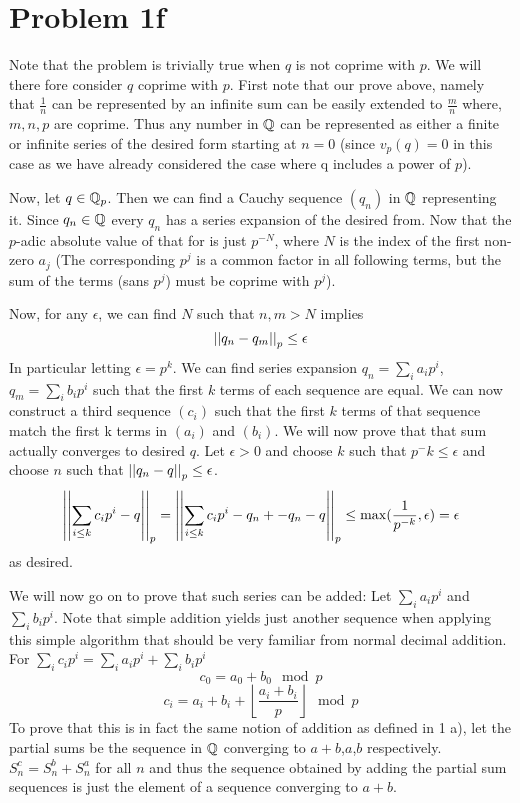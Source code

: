 \section*{Problem 1f}
Note that the problem is trivially true when $q$ is not coprime with $p$. We will there fore consider $q$ coprime with $p$. First note that our prove above, namely that $\frac{1}{n}$ can be represented by an infinite sum can be easily extended to $\frac{m}{n}$ where, $m,n,p$ are coprime. Thus any number in $\mathbb{Q}$ can be represented as either a finite or infinite series of the desired form starting at $n=0$ (since $v_p(q) = 0$ in this case as we have already considered the case where q includes a power of $p$).  \par
Now, let $q\in \mathbb{Q}_p$. Then we can find a Cauchy sequence $(q_n)$ in $\mathbb{Q}$ representing it. Since $q_n \in \mathbb{Q}$ every $q_n$ has a series expansion of the desired from. Now that the $p$-adic absolute value of that for is just $p^{-N}$, where $N$ is the index of the first non-zero $a_j$ (The corresponding $p^j$ is a common factor in all following terms, but the sum of the terms (sans $p^j$) must be coprime with $p^j$). \par
Now, for any $\epsilon$, we can find $N$ such that $n,m>N$ implies 
\[ \left|\left| q_n-q_m \right|\right|_p \leq \epsilon \]
In particular letting $\epsilon = p^k$. We can find series expansion $q_n=\sum_i a_ip^i$, $q_m=\sum_i b_ip^i$ such that the first $k$ terms of each sequence are equal. We can now construct a third sequence $(c_i)$ such that the first $k$ terms of that sequence match the first k terms in $(a_i)$ and $(b_i)$.
We will now prove that that sum actually converges to desired $q$. Let $\epsilon>0$ and choose $k$ such that $p^-k \leq \epsilon$ and choose $n$ such that $\left|\left| q_n - q \right|\right|_p\leq\epsilon$.
 \[\left|\left| \sum_{i\leq k} c_ip^i - q \right|\right|_p = \left|\left| \sum_{i\leq k} c_ip^i - q_n +- q_n  - q \right|\right|_p\leq \max(\frac{1}{p^{-k}},\epsilon) = \epsilon \]
 as desired. \par 
 We will now go on to prove that such series can be added: 
Let $\sum_i a_ip^i$ and $\sum_i b_ip^i$. Note that simple addition yields just another sequence when applying this simple algorithm that should be very familiar from normal decimal addition. For $\sum_i c_ip^i = \sum_i a_ip^i + \sum_i b_ip^i$
\[ c_0 = a_0+b_0 \mod{p} \]
\[ c_i = a_i + b_i + \left\lfloor\frac{a_i+b_i}{p}\right\rfloor \mod{p} \]
To prove that this is in fact the same notion of addition as defined in 1 a), let the partial sums be the sequence in $\mathbb{Q}$ converging to $a+b$,$a$,$b$ respectively. $S^c_n = S^b_n + S^a_n$ for all $n$ and thus the sequence obtained by adding the partial sum sequences is just the element of a sequence converging to $a+b$. \par 
